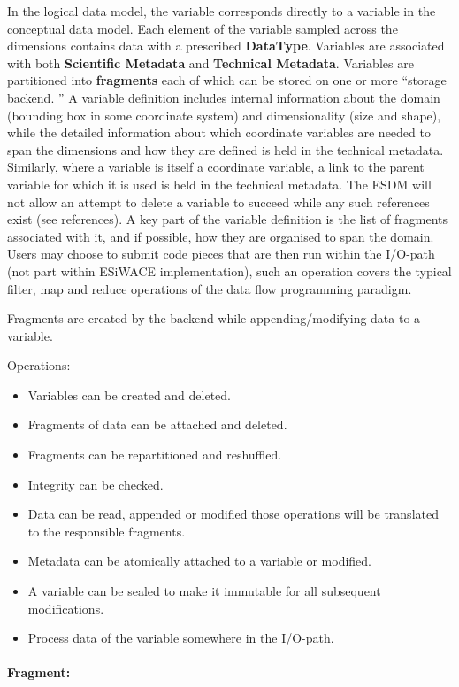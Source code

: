 In the logical data model, the variable corresponds directly to a variable in the conceptual data model.
Each element of the variable sampled across the dimensions contains data with a prescribed \textbf{DataType}.
Variables are associated with both \textbf{Scientific Metadata} and \textbf{Technical Metadata}.
Variables are partitioned into \textbf{fragments} each of which can be stored on one or more ``storage backend.
'' A variable definition includes internal information about the domain (bounding box in some coordinate system) and dimensionality (size and shape), while the detailed information about which coordinate variables are needed to span the dimensions and how they are defined is held in the technical metadata.
Similarly, where a variable is itself a coordinate variable, a link to the parent variable for which it is used is held in the technical metadata.
The ESDM will not allow an attempt to delete a variable to succeed while any such references exist (see references).
A key part of the variable definition is the list of fragments associated with it, and if possible, how they are organised to span the domain.
Users may choose to submit code pieces that are then run within the I/O-path (not part within ESiWACE implementation), such an operation covers the typical filter, map and reduce operations of the data flow programming paradigm.
 
Fragments are created by the backend while appending/modifying data to a variable.

Operations:

\begin{itemize}
  \item Variables can be created and deleted.
  \item Fragments of data can be attached and deleted.
  \item Fragments can be repartitioned and reshuffled.
  \item Integrity can be checked.
  \item Data can be read, appended or modified those operations will be translated to the responsible fragments.
  \item Metadata can be atomically attached to a variable or modified.
  \item A variable can be sealed to make it immutable for all subsequent modifications.
  \item Process data of the variable somewhere in the I/O-path.
\end{itemize}

\paragraph{Fragment:}%
\label{fragment}

